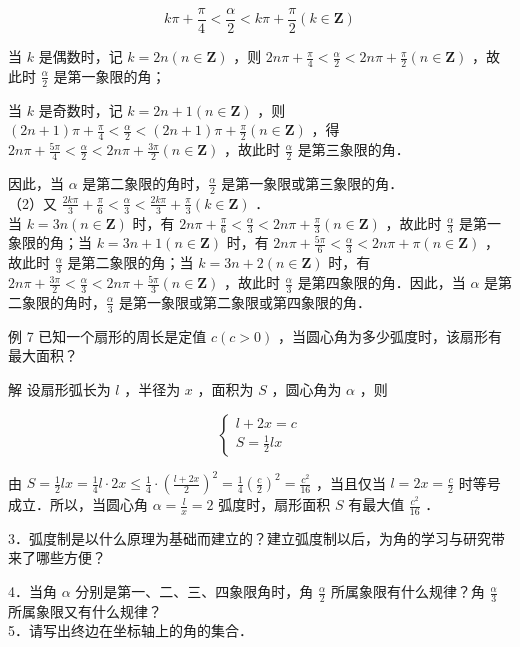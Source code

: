 \documentclass[10pt]{article}
\begin{document}
\[
k \pi+\frac{\pi}{4}<\frac{\alpha}{2}<k \pi+\frac{\pi}{2}(k \in \mathbf{Z})
\]

当 \(k\) 是偶数时，记 \(k=2 n(n \in \mathbf{Z})\) ，则 \(2 n \pi+\frac{\pi}{4}<\frac{\alpha}{2}<2 n \pi+\frac{\pi}{2}(n \in \mathbf{Z})\) ，故此时 \(\frac{\alpha}{2}\) 是第一象限的角；

当 \(k\) 是奇数时，记 \(k=2 n+1(n \in \mathbf{Z})\) ，则 \((2 n+1) \pi+\frac{\pi}{4}<\frac{\alpha}{2}<(2 n+1) \pi+\frac{\pi}{2}(n \in \mathbf{Z})\) ，得 \(2 n \pi+\frac{5 \pi}{4}<\frac{\alpha}{2}<2 n \pi+\frac{3 \pi}{2}(n \in \mathbf{Z})\) ，故此时 \(\frac{\alpha}{2}\) 是第三象限的角．

因此，当 \(\alpha\) 是第二象限的角时，\(\frac{\alpha}{2}\) 是第一象限或第三象限的角．\\
（2）又 \(\frac{2 k \pi}{3}+\frac{\pi}{6}<\frac{\alpha}{3}<\frac{2 k \pi}{3}+\frac{\pi}{3}(k \in \mathbf{Z})\) ．\\
当 \(k=3 n(n \in \mathbf{Z})\) 时，有 \(2 n \pi+\frac{\pi}{6}<\frac{\alpha}{3}<2 n \pi+\frac{\pi}{3}(n \in \mathbf{Z})\) ，故此时 \(\frac{\alpha}{3}\) 是第一象限的角；当 \(k=3 n+1(n \in \mathbf{Z})\) 时，有 \(2 n \pi+\frac{5 \pi}{6}<\frac{\alpha}{3}<2 n \pi+\pi(n \in \mathbf{Z})\) ，故此时 \(\frac{\alpha}{3}\) 是第二象限的角；当 \(k=3 n+2(n \in \mathbf{Z})\) 时，有 \(2 n \pi+\frac{3 \pi}{2}<\frac{\alpha}{3}<2 n \pi+\frac{5 \pi}{3}(n \in \mathbf{Z})\) ，故此时 \(\frac{\alpha}{3}\) 是第四象限的角．因此，当 \(\alpha\) 是第二象限的角时，\(\frac{\alpha}{3}\) 是第一象限或第二象限或第四象限的角．

例 7 已知一个扇形的周长是定值 \(c(c>0)\) ，当圆心角为多少弧度时，该扇形有最大面积？

解 设扇形弧长为 \(l\) ，半径为 \(x\) ，面积为 \(S\) ，圆心角为 \(\alpha\) ，则

\[
\left\{\begin{array}{l}
l+2 x=c \\
S=\frac{1}{2} l x
\end{array}\right.
\]

由 \(S=\frac{1}{2} l x=\frac{1}{4} l \cdot 2 x \leqslant \frac{1}{4} \cdot\left(\frac{l+2 x}{2}\right)^{2}=\frac{1}{4}\left(\frac{c}{2}\right)^{2}=\frac{c^{2}}{16}\) ，当且仅当 \(l=2 x=\frac{c}{2}\) 时等号成立．所以，当圆心角 \(\alpha=\frac{l}{x}=2\) 弧度时，扇形面积 \(S\) 有最大值 \(\frac{c^{2}}{16}\) ．

3．弧度制是以什么原理为基础而建立的？建立弧度制以后，为角的学习与研究带来了哪些方便？

4．当角 \(\alpha\) 分别是第一、二、三、四象限角时，角 \(\frac{\alpha}{2}\) 所属象限有什么规律？角 \(\frac{\alpha}{3}\) 所属象限又有什么规律？\\
5．请写出终边在坐标轴上的角的集合．
\end{document}

